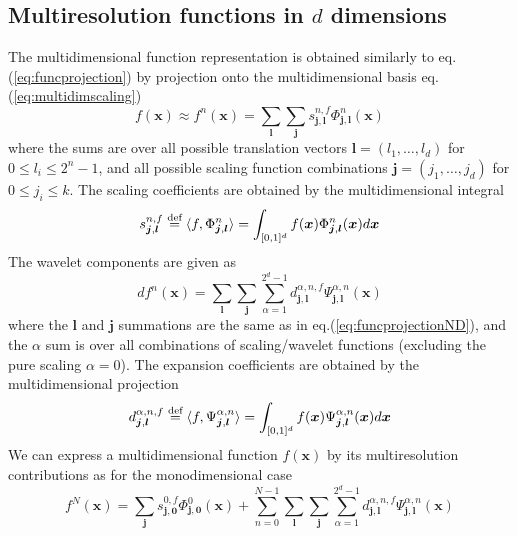 \subsection{Multiresolution functions in $d$ dimensions}
The multidimensional function representation is obtained similarly to
eq.(\ref{eq:funcprojection}) by projection onto the multidimensional basis
eq.(\ref{eq:multidimscaling})
\begin{equation}
	\label{eq:funcprojectionND}
	f(\boldsymbol{x}) \approx f^n(\boldsymbol{x}) = \sum_{\boldsymbol{l}}
	\sum_{\boldsymbol{j}} s^{n,f}_{\boldsymbol{j},\boldsymbol{l}} 
	\Phi^n_{\boldsymbol{j},\boldsymbol{l}}(\boldsymbol{x})
\end{equation}
where the sums are over all possible translation vectors 
$\boldsymbol{l} = (l_1,\dots,l_d)$ for $0\leq l_i\leq 2^n-1$, and all possible 
scaling function combinations $\boldsymbol{j} = (j_1,\dots,j_d)$ for 
$0\leq j_i\leq k$. The scaling coefficients are obtained by the
multidimensional integral
\begin{equation}
	s^{n,f}_{\boldsymbol{j},\boldsymbol{l}} \stackrel{\text{def}}{\hbox{=}} \langle f,
	\Phi^n_{\boldsymbol{j},\boldsymbol{l}}\rangle =
	\int_{[0,1]^d}f(\boldsymbol{x})\Phi^n_{\boldsymbol{j},
	\boldsymbol{l}}(\boldsymbol{x})d\boldsymbol{x}
\end{equation}
The wavelet components are given as
\begin{equation}
	df^n(\boldsymbol{x}) = \sum_{\boldsymbol{l}} \sum_{\boldsymbol{j}} 
	\sum_{\alpha=1}^{2^d-1}d^{\alpha,n,f}_{\boldsymbol{j},\boldsymbol{l}} 
	\Psi^{\alpha,n}_{\boldsymbol{j},\boldsymbol{l}}(\boldsymbol{x})
\end{equation}
where the $\boldsymbol{l}$ and $\boldsymbol{j}$ summations are the same as in
eq.(\ref{eq:funcprojectionND}), and the $\alpha$ sum is over all combinations of
scaling/wavelet functions (excluding the pure scaling $\alpha=0$).
The expansion coefficients are obtained by the multidimensional projection
\begin{equation}
	d^{\alpha,n,f}_{\boldsymbol{j},\boldsymbol{l}} \stackrel{\text{def}}{\hbox{=}} \langle f,
	\Psi^{\alpha,n}_{\boldsymbol{j},\boldsymbol{l}}\rangle =
	\int_{[0,1]^d}f(\boldsymbol{x})\Psi^{\alpha,n}_{\boldsymbol{j},
	\boldsymbol{l}}(\boldsymbol{x})d\boldsymbol{x}
\end{equation}
We can express a multidimensional function $f(\boldsymbol{x})$ by its 
multiresolution contributions as for the monodimensional case
\begin{equation}
	f^N(\boldsymbol{x}) =
	\sum_{\boldsymbol{j}}s^{0,f}_{\boldsymbol{j},\boldsymbol{0}}
	\Phi^0_{\boldsymbol{j},\boldsymbol{0}}(\boldsymbol{x}) + \sum_{n=0}^{N-1}
	\sum_{\boldsymbol{l}}\sum_{\boldsymbol{j}}\sum_{\alpha=1}^{2^d-1}
	d^{\alpha,n,f}_{\boldsymbol{j},\boldsymbol{l}}
	\Psi^{\alpha,n}_{\boldsymbol{j},\boldsymbol{l}}(\boldsymbol{x})
\end{equation}

